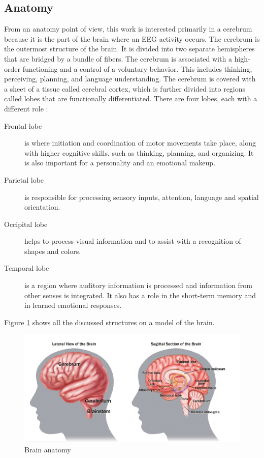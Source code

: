 \subsection{Anatomy}
From an anatomy point of view, this work is interested primarily in a cerebrum because it is the part of the brain where an EEG activity occurs.
The cerebrum is the outermost structure of the brain. It is divided into two separate hemispheres that are
bridged by a bundle of fibers. The cerebrum is associated with a high-order
functioning and a control of a voluntary behavior. This includes thinking,
perceiving, planning, and language understanding. The cerebrum is covered with a
sheet of a tissue called cerebral cortex, which is further divided into regions called lobes
that are functionally differentiated. There are four lobes,
each with a different role \cite{brainFacts}: 
\begin{description}
	\item[Frontal lobe] is where initiation and coordination
	of motor movements take place, along with higher cognitive skills, such as
	thinking, planning, and organizing. It is also important for a personality and
	an emotional makeup.
	\item[Parietal lobe] is responsible for processing sensory
	inputs, attention, language and spatial orientation.
	\item[Occipital lobe]  helps to	process visual information and to assist with a recognition of shapes and colors.
	\item[Temporal lobe] is a region where auditory information is processed and
	information from other senses is integrated. It also has a role in the
	short-term memory and in learned emotional responses.
\end{description}
Figure \ref{fig:brainAnatomy} shows all the discussed structures on a model of the brain.

\begin{figure}[htb]
	\centering
	\includegraphics[width=1\linewidth]{fig/BrainAnatomy.jpg}
	\caption[Caption for LOF]{Brain anatomy\protect\footnotemark}
	\label{fig:brainAnatomy}
\end{figure}

